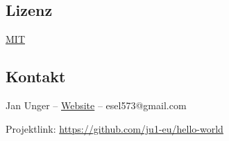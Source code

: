 \documentclass{vorlage-design-main}
\begin{document}
\hypertarget{lizenz}{%
\subsection{Lizenz}\label{lizenz}}

\href{https://choosealicense.com/licenses/mit/}{MIT}

\hypertarget{kontakt}{%
\subsection{Kontakt}\label{kontakt}}

Jan Unger -- \href{https://bw-ju.de/}{Website} -- esel573@gmail.com

Projektlink: \url{https://github.com/ju1-eu/hello-world} %


\clearpage
\printbibliography
\end{document}
